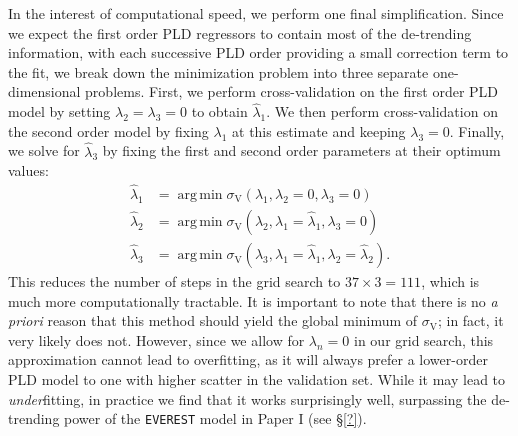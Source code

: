 \documentclass[]{emulateapj}
\DeclareMathOperator*{\argmin}{arg\,min}
\begin{document}
In the interest of computational speed, we perform one final simplification. Since we
expect the first order PLD regressors to contain most of the de-trending information,
with each successive PLD order providing a small correction term to the fit, we break
down the minimization problem into three separate one-dimensional problems.
First, we perform cross-validation on the first order PLD model by setting $\lambda_2 = \lambda_3 = 0$
to obtain $\hat{\lambda}_1$. We then perform cross-validation on the second order model
by fixing $\lambda_1$ at this estimate and keeping $\lambda_3 = 0$. Finally, we solve
for $\hat{\lambda}_3$ by fixing the first and second order parameters at their optimum
values:
%
\begin{align}
\hat{\lambda}_1 &= \argmin \sigma_\mathrm{V}(\lambda_1, \lambda_2 = 0,               \lambda_3 = 0) \nonumber\\
\hat{\lambda}_2 &= \argmin \sigma_\mathrm{V}(\lambda_2, \lambda_1 = \hat{\lambda}_1, \lambda_3 = 0) \nonumber\\
\hat{\lambda}_3 &= \argmin \sigma_\mathrm{V}(\lambda_3, \lambda_1 = \hat{\lambda}_1, \lambda_2 = \hat{\lambda}_2).
\end{align}
%
This reduces the number of steps in the grid search to $37\times 3 = 111$, which is much
more computationally tractable. It is important to note that there is no \emph{a priori} reason
that this method should yield the global minimum of $\sigma_\mathrm{V}$; in fact, it very
likely does not. However, since we allow for $\lambda_n = 0$ in our grid search, this approximation
cannot lead to overfitting, as it will always prefer a lower-order PLD model to one
with higher scatter in the validation set. While it may lead to \emph{under}fitting,
in practice we find that it works surprisingly well,
surpassing the de-trending power of the \texttt{EVEREST} model in Paper I (see \S\ref{?}).
\end{document}
